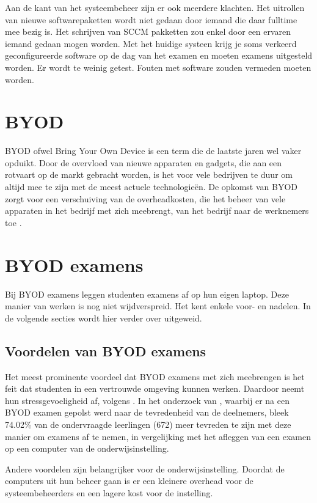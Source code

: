 Aan de kant van het systeembeheer zijn er ook meerdere klachten. Het uitrollen van nieuwe softwarepaketten wordt niet gedaan door iemand die daar fulltime mee bezig is. Het schrijven van SCCM pakketten zou enkel door een ervaren iemand gedaan mogen worden.  Met het huidige systeen krijg je soms verkeerd geconfigureerde software op de dag van het examen en moeten examens uitgesteld worden. Er wordt te weinig getest. Fouten met software zouden vermeden moeten worden. 

\section{BYOD}

BYOD ofwel Bring Your Own Device is een term die de laatste jaren wel vaker opduikt. Door de overvloed van nieuwe apparaten en gadgets, die aan een rotvaart op de markt gebracht worden, is het voor vele bedrijven te duur om altijd mee te zijn met de meest actuele technologieën. De opkomst van BYOD zorgt voor een verschuiving van de overheadkosten, die het beheer van vele apparaten in het bedrijf met zich meebrengt, van het bedrijf naar de werknemers toe \autocite{Hong2016}.

\section{BYOD examens}
Bij BYOD examens leggen studenten examens af op hun eigen laptop. Deze manier van werken is nog niet wijdverspreid. Het kent enkele voor- en nadelen. In de volgende secties wordt hier verder over uitgeweid. 

\subsection{Voordelen van BYOD examens}
Het meest prominente voordeel dat BYOD examens met zich meebrengen is het feit dat studenten in een vertrouwde omgeving kunnen werken. Daardoor neemt hun stressgevoeligheid af, volgens
\textcite{TeckSwee2014}. In het onderzoek van \textcite{TeckSwee2014}, waarbij er na een BYOD examen gepolst werd naar de tevredenheid van de deelnemers, bleek 74.02\% van de ondervraagde leerlingen (672) meer tevreden te zijn met deze manier om examens af te nemen, in vergelijking met het afleggen van een examen op een computer van de onderwijsinstelling. 

Andere voordelen zijn belangrijker voor de onderwijsinstelling. Doordat de computers uit hun beheer gaan is er een kleinere overhead voor de systeembeheerders en een lagere kost voor de instelling.

